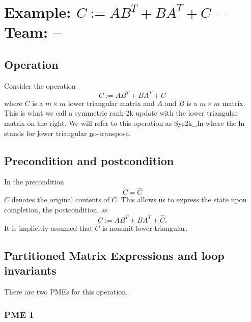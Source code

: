 \chapter{Example: $ C := A B ^ T + B A ^ T + C $ --  \large Team: --}



\section{Operation}

Consider the operation
\[
C := A B ^ T + B A ^ T + C
\]
where $ C $ is a $ m \times m $ lower triangular matrix and $ A $ and $ B $ is a $ m \times m $ matrix.
This is what we call a symmetric rank-2k update
with the {\sc l}ower triangular matrix on the {\sc r}ight.
We will refer to this operation
as {\sc Syr2k\_ln} where the {\sc ln} stands for
\underline{l}ower triangular
\underline{n}o-transpose.

\section{Precondition and postcondition}

In the precondition 
\[
C = \widehat C
\]
$ \widehat C $ denotes the original contents of $ C $.
This allows us to express the state upon completion, the postcondition, as
\[
C := A B ^ T + B A ^ T + \widehat C.
\]
It is implicitly assumed that $ C $ is nonunit lower triangular.
\section{Partitioned Matrix Expressions and loop invariants}

There are two PMEs for this operation.

\subsection{PME 1}

